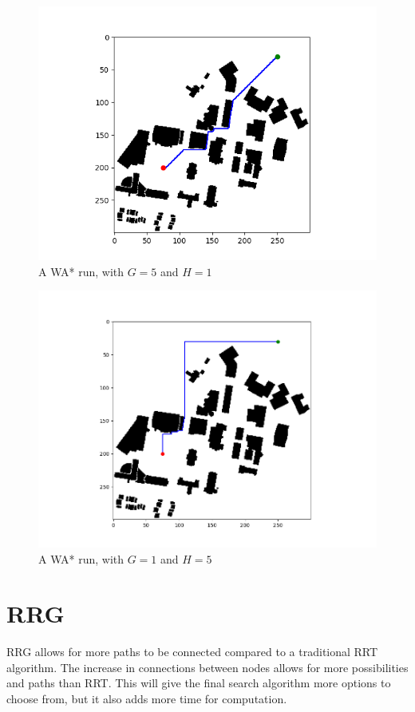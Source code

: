 \documentclass[journal]{IEEEtran}
\begin{document}
    \begin{figure}[h!]
        \centering
        \includegraphics[width=\linewidth]{figures/WA_G1_H5.png}
        \caption{A WA* run, with \(G = 5\) and \(H = 1\)}
    \end{figure}

    \begin{figure}[h!]
        \centering
        \includegraphics[width=\linewidth]{figures/WA_G5_H1.png}
        \caption{A WA* run, with \(G = 1\) and \(H = 5\)}
    \end{figure}

    \section{RRG}
    RRG allows for more paths to be connected compared to a traditional RRT algorithm. The increase in connections between nodes allows for more possibilities and paths than RRT. This will give the final search algorithm more options to choose from, but it also adds more time for computation.
\end{document}
